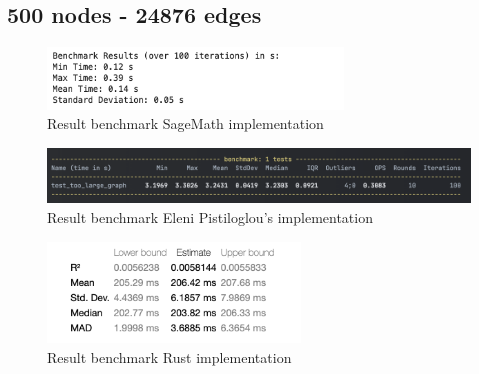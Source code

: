 \newpage

\subsection{500 nodes - 24876 edges}\label{subsec:result-for-graphs-500-24876}

\begin{figure}[!h]
    \centering
    \includegraphics[width=0.70\textwidth]{images/benchmark/too_large_graph/benchmark_too_large_graph_sagemath}
    \caption{Result benchmark SageMath implementation}
    \label{fig:benchmark-graph-500-24876-sagemath}
\end{figure}

\begin{figure}[!h]
    \centering
    \includegraphics[width=1\textwidth]{images/benchmark/too_large_graph/benchmark_too_large_graph_python}
    \caption{Result benchmark Eleni Pistiloglou's implementation}
    \label{fig:benchmark-graph-500-24876-python}
\end{figure}

\begin{figure}[!h]
    \centering
    \includegraphics[width=0.60\textwidth]{images/benchmark/too_large_graph/benchmark_graph_500_24876_rust}
    \caption{Result benchmark Rust implementation}
    \label{fig:benchmark-graph-500-24876-rust}
\end{figure}

